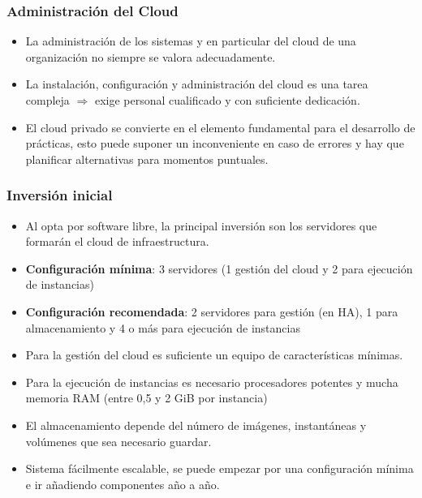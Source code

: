 \documentclass{beamer}
\begin{document}
\begin{frame}
  \frametitle{Administración del Cloud}
  \begin{itemize}
  \item La administración de los sistemas y en particular del cloud de
    una organización no siempre se valora adecuadamente.
  \item La instalación, configuración y administración del cloud es
    una tarea compleja $\Rightarrow$ exige personal cualificado y con
    suficiente dedicación. 
  \item El cloud privado se convierte en el elemento fundamental para
    el desarrollo de prácticas, esto puede suponer un inconveniente en
    caso de errores y hay que planificar alternativas para momentos
    puntuales.
  \end{itemize}
\end{frame}

\begin{frame}
  \frametitle{Inversión inicial}
  \begin{itemize}
  \item Al opta por software libre, la principal inversión son los servidores
    que formarán el cloud de infraestructura.
  \item \textbf{Configuración mínima}: 3 servidores (1 gestión del cloud y 2 para
    ejecución de instancias)
  \item \textbf{Configuración recomendada}: 2 servidores para gestión (en HA), 1
    para almacenamiento y 4 o más para ejecución de instancias
  \item Para la gestión del cloud es suficiente un equipo de características
    mínimas.
  \item Para la ejecución de instancias es necesario procesadores potentes y
    mucha memoria RAM (entre 0,5 y 2 GiB por instancia)
  \item El almacenamiento depende del número de imágenes, instantáneas y
    volúmenes que sea necesario guardar.
  \item Sistema fácilmente escalable, se puede empezar por una
    configuración mínima e ir añadiendo componentes año a año.
  \end{itemize}
\end{frame}
\end{document}
